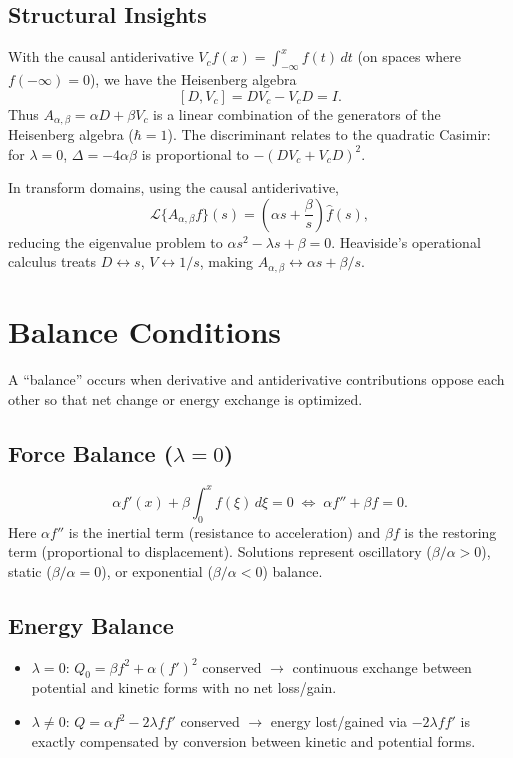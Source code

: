 \documentclass[11pt]{article}
\begin{document}
\subsection{Structural Insights}
With the causal antiderivative $V_c f(x) = \int_{-\infty}^x f(t)\,dt$ (on spaces where $f(-\infty)=0$), we have the Heisenberg algebra
\[
[D, V_c] = D V_c - V_c D = I.
\]
Thus $A_{\alpha,\beta} = \alpha D + \beta V_c$ is a linear combination of the generators of the Heisenberg algebra ($\hbar=1$). The discriminant relates to the quadratic Casimir: for $\lambda=0$, $\Delta = -4\alpha\beta$ is proportional to $-(D V_c + V_c D)^2$.

In transform domains, using the causal antiderivative,
\[
\mathcal{L}\{A_{\alpha,\beta} f\}(s) = \left(\alpha s + \frac{\beta}{s}\right) \hat{f}(s),
\]
reducing the eigenvalue problem to $\alpha s^2 - \lambda s + \beta = 0$. Heaviside's operational calculus treats $D \leftrightarrow s$, $V \leftrightarrow 1/s$, making $A_{\alpha,\beta} \leftrightarrow \alpha s + \beta/s$.

\section{Balance Conditions}
A ``balance'' occurs when derivative and antiderivative contributions oppose each other so that net change or energy exchange is optimized.

\subsection{Force Balance ($\lambda=0$)}
\[
\alpha f'(x) + \beta \int_0^x f(\xi)\,d\xi = 0
\;\Longleftrightarrow\;
\alpha f'' + \beta f = 0.
\]
Here $\alpha f''$ is the inertial term (resistance to acceleration) and $\beta f$ is the restoring term (proportional to displacement). Solutions represent oscillatory ($\beta/\alpha>0$), static ($\beta/\alpha=0$), or exponential ($\beta/\alpha<0$) balance.

\subsection{Energy Balance}
\begin{itemize}
\item $\lambda=0$: $Q_0 = \beta f^2 + \alpha (f')^2$ conserved $\rightarrow$ continuous exchange between potential and kinetic forms with no net loss/gain.
\item $\lambda \neq 0$: $Q = \alpha f^2 - 2\lambda f f'$ conserved $\rightarrow$ energy lost/gained via $-2\lambda f f'$ is exactly compensated by conversion between kinetic and potential forms.
\end{itemize}
\end{document}
